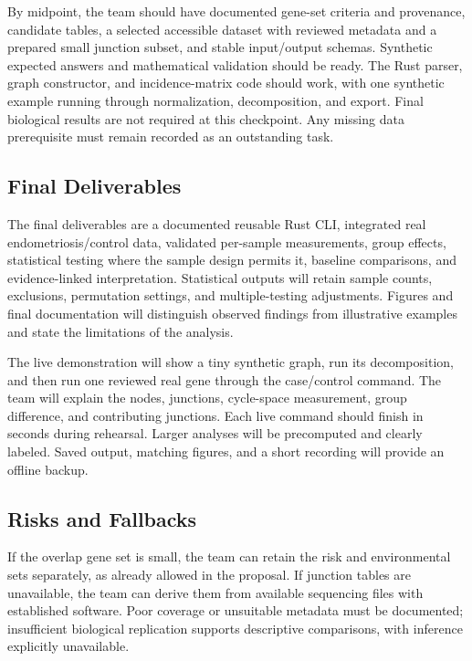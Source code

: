 By midpoint, the team should have documented gene-set criteria and provenance,
candidate tables, a selected accessible dataset with reviewed metadata and a
prepared small junction subset, and stable input/output schemas. Synthetic
expected answers and mathematical validation should be ready. The Rust parser,
graph constructor, and incidence-matrix code should work, with one synthetic
example running through normalization, decomposition, and export. Final
biological results are not required at this checkpoint. Any missing data
prerequisite must remain recorded as an outstanding task.

\subsection{Final Deliverables}

The final deliverables are a documented reusable Rust CLI, integrated real
endometriosis/control data, validated per-sample measurements, group effects,
statistical testing where the sample design permits it, baseline comparisons,
and evidence-linked interpretation. Statistical outputs will retain sample
counts, exclusions, permutation settings, and multiple-testing adjustments.
Figures and final documentation will distinguish observed findings from
illustrative examples and state the limitations of the analysis.

The live demonstration will show a tiny synthetic graph, run its decomposition,
and then run one reviewed real gene through the case/control command. The team
will explain the nodes, junctions, cycle-space measurement, group difference,
and contributing junctions. Each live command should finish in seconds during
rehearsal. Larger analyses will be precomputed and clearly labeled. Saved output,
matching figures, and a short recording will provide an offline backup.

\subsection{Risks and Fallbacks}

If the overlap gene set is small, the team can retain the risk and environmental
sets separately, as already allowed in the proposal. If junction tables are
unavailable, the team can derive them from available sequencing files with
established software. Poor coverage or unsuitable metadata must be documented;
insufficient biological replication supports descriptive comparisons, with
inference explicitly unavailable.


